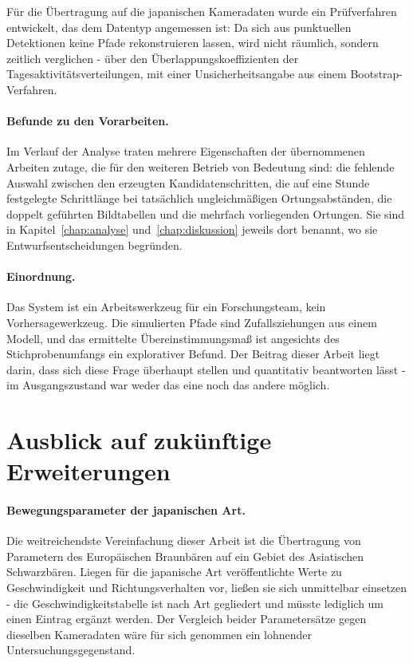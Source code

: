 \documentclass[12pt,a4paper]{report}
\begin{document}
Für die Übertragung auf die japanischen Kameradaten wurde ein Prüfverfahren entwickelt, das
dem Datentyp angemessen ist: Da sich aus punktuellen Detektionen keine Pfade rekonstruieren
lassen, wird nicht räumlich, sondern zeitlich verglichen - über den Überlappungskoeffizienten
der Tagesaktivitätsverteilungen, mit einer Unsicherheitsangabe aus einem Bootstrap-Verfahren.

\paragraph{Befunde zu den Vorarbeiten.} Im Verlauf der Analyse traten mehrere Eigenschaften
der übernommenen Arbeiten zutage, die für den weiteren Betrieb von Bedeutung sind: die
fehlende Auswahl zwischen den erzeugten Kandidatenschritten, die auf eine Stunde festgelegte
Schrittlänge bei tatsächlich ungleichmäßigen Ortungsabständen, die doppelt geführten
Bildtabellen und die mehrfach vorliegenden Ortungen. Sie sind in
Kapitel~\ref{chap:analyse} und~\ref{chap:diskussion} jeweils dort benannt, wo sie
Entwurfsentscheidungen begründen.

\paragraph{Einordnung.} Das System ist ein Arbeitswerkzeug für ein Forschungsteam, kein
Vorhersagewerkzeug. Die simulierten Pfade sind Zufallsziehungen aus einem Modell, und das
ermittelte Übereinstimmungsmaß ist angesichts des Stichprobenumfangs ein explorativer Befund.
Der Beitrag dieser Arbeit liegt darin, dass sich diese Frage überhaupt stellen und
quantitativ beantworten lässt - im Ausgangszustand war weder das eine noch das andere
möglich.

\section{Ausblick auf zukünftige Erweiterungen}
\label{sec:ausblick}

\paragraph{Bewegungsparameter der japanischen Art.} Die weitreichendste Vereinfachung dieser
Arbeit ist die Übertragung von Parametern des Europäischen Braunbären auf ein Gebiet des
Asiatischen Schwarzbären. Liegen für die japanische Art veröffentlichte Werte zu
Geschwindigkeit und Richtungsverhalten vor, ließen sie sich unmittelbar einsetzen - die
Geschwindigkeitstabelle ist nach Art gegliedert und müsste lediglich um einen Eintrag
ergänzt werden. Der Vergleich beider Parametersätze gegen dieselben Kameradaten wäre für
sich genommen ein lohnender Untersuchungsgegenstand.
\end{document}
